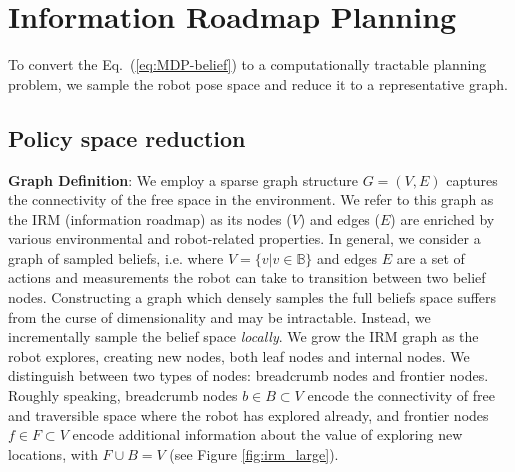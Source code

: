 \documentclass{article}
\newcommand{\ph}[1]{{\textbf{#1}:}} %
\begin{document}
\section{Information Roadmap Planning}\label{sec:planning}
To convert the Eq.~(\ref{eq:MDP-belief}) to a computationally tractable planning problem, we sample the robot pose space and reduce it to a representative graph. 


\subsection{Policy space reduction}


\ph{Graph Definition}
We employ a sparse graph structure $G = (V, E)$ captures the connectivity of the free space in the environment.  We refer to this graph as the IRM (information roadmap) as its nodes ($V$) and edges ($E$) are enriched by various environmental and robot-related properties.  In general, we consider a graph of sampled beliefs, i.e. where $V=\{v|v\in\mathbb{B}\}$ and edges $E$ are a set of actions and measurements the robot can take to transition between two belief nodes. Constructing a graph which densely samples the full beliefs space suffers from the curse of dimensionality and may be intractable.  Instead, we incrementally sample the belief space \textit{locally}.  We grow the IRM graph as the robot explores, creating new nodes, both leaf nodes and internal nodes.  We distinguish between two types of nodes:  breadcrumb nodes and frontier nodes.  Roughly speaking, breadcrumb nodes $b\in B \subset V$ encode the connectivity of free and traversible space where the robot has explored already, and frontier nodes $f\in F\subset V$ encode additional information about the value of exploring new locations, with $F\cup B = V$ (see Figure \ref{fig:irm_large}).
\end{document}
